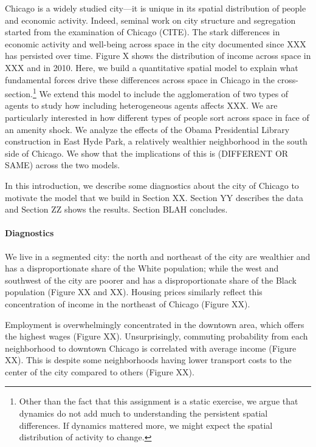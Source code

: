 
Chicago is a widely studied city---it is unique in its spatial distribution of people and economic activity. Indeed, seminal work on city structure and segregation started from the examination of Chicago (CITE). The stark differences in economic activity and well-being across space in the city documented since XXX has persisted over time. Figure X shows the distribution of income across space in XXX and in 2010. Here, we build a quantitative spatial model to explain what fundamental forces drive these differences across space in Chicago in the cross-section.\footnote{Other than the fact that this assignment is a static exercise, we argue that dynamics do not add much to understanding the persistent spatial differences. If dynamics mattered more, we might expect the spatial distribution of activity to change.} We extend this model to include the agglomeration of two types of agents to study how including heterogeneous agents affects XXX. We are particularly interested in how different types of people sort across space in face of an amenity shock. We analyze the effects of the Obama Presidential Library construction in East Hyde Park, a relatively wealthier neighborhood in the south side of Chicago. We show that the implications of this is (DIFFERENT OR SAME) across the two models.


In this introduction, we describe some diagnostics about the city of Chicago to motivate the model that we build in Section XX. Section YY describes the data and Section ZZ shows the results. Section BLAH concludes.

\paragraph{Diagnostics}

We live in a segmented city: the north and northeast of the city are wealthier and has a disproportionate share of the White population; while the west and southwest of the city are poorer and has a disproportionate share of the Black population (Figure XX and XX). Housing prices similarly reflect this concentration of income in the northeast of Chicago (Figure XX). 

Employment is overwhelmingly concentrated in the downtown area, which offers the highest wages (Figure XX). Unsurprisingly, commuting probability from each neighborhood to downtown Chicago is correlated with average income (Figure XX). This is despite some neighborhoods having lower transport costs to the center of the city compared to others (Figure XX). 


